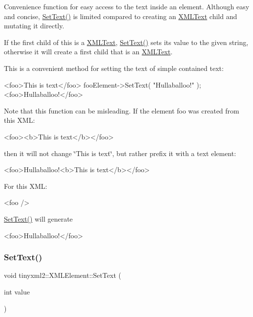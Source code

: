 Convenience function for easy access to the text inside an element. Although easy and concise, \mbox{\hyperlink{classtinyxml2_1_1_x_m_l_element_a1f9c2cd61b72af5ae708d37b7ad283ce}{Set\+Text()}} is limited compared to creating an \mbox{\hyperlink{classtinyxml2_1_1_x_m_l_text}{X\+M\+L\+Text}} child and mutating it directly.

If the first child of \textquotesingle{}this\textquotesingle{} is a \mbox{\hyperlink{classtinyxml2_1_1_x_m_l_text}{X\+M\+L\+Text}}, \mbox{\hyperlink{classtinyxml2_1_1_x_m_l_element_a1f9c2cd61b72af5ae708d37b7ad283ce}{Set\+Text()}} sets its value to the given string, otherwise it will create a first child that is an \mbox{\hyperlink{classtinyxml2_1_1_x_m_l_text}{X\+M\+L\+Text}}.

This is a convenient method for setting the text of simple contained text\+: \begin{DoxyVerb}<foo>This is text</foo>
    fooElement->SetText( "Hullaballoo!" );
<foo>Hullaballoo!</foo>
\end{DoxyVerb}


Note that this function can be misleading. If the element foo was created from this X\+ML\+: \begin{DoxyVerb}    <foo><b>This is text</b></foo>
\end{DoxyVerb}


then it will not change \char`\"{}\+This is text\char`\"{}, but rather prefix it with a text element\+: \begin{DoxyVerb}    <foo>Hullaballoo!<b>This is text</b></foo>
\end{DoxyVerb}


For this X\+ML\+: \begin{DoxyVerb}    <foo />
\end{DoxyVerb}
 \mbox{\hyperlink{classtinyxml2_1_1_x_m_l_element_a1f9c2cd61b72af5ae708d37b7ad283ce}{Set\+Text()}} will generate \begin{DoxyVerb}    <foo>Hullaballoo!</foo>
\end{DoxyVerb}
 \mbox{\label{classtinyxml2_1_1_x_m_l_element_aeae8917b5ea6060b3c08d4e3d8d632d7}} 
\subsubsection{\texorpdfstring{Set\+Text()}{SetText()}\hspace{0.1cm}{\footnotesize\ttfamily [2/7]}}
{\footnotesize\ttfamily void tinyxml2\+::\+X\+M\+L\+Element\+::\+Set\+Text (\begin{DoxyParamCaption}\item[{int}]{value }\end{DoxyParamCaption})}



